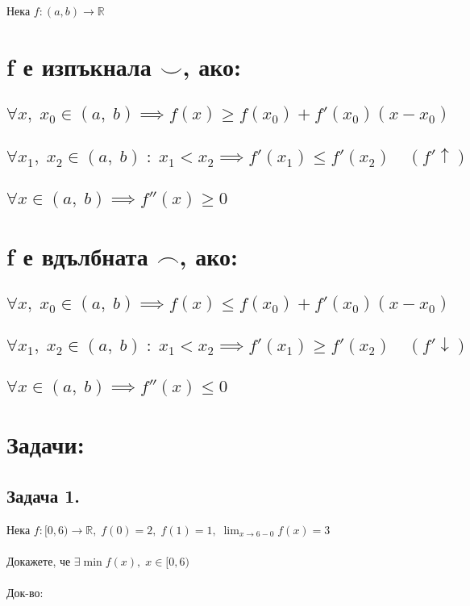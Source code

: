 \documentclass[12pt]{article}
\newcommand{\R}{\mathbb{R}}
\begin{document}
Нека \(f: (a, b) \to \R\)
\section*{f е изпъкнала \(\smile\), ако:}
\subsection*{\(\forall x, \; x_0 \in (a, \; b) \implies f(x) \geq f(x_0) + f'(x_0)(x - x_0)\)}
\subsection*{\(\forall x_1, \; x_2 \in (a, \; b) \; : \; x_1 < x_2 \implies f'(x_1) \leq f'(x_2) \quad (f'\uparrow) \)}
\subsection*{\(\forall x \in (a,\;  b) \implies f''(x) \geq 0\)}
\section*{f е вдълбната \(\frown\), ако:}
\subsection*{\(\forall x, \; x_0 \in (a, \; b) \implies f(x) \leq f(x_0) + f'(x_0)(x - x_0)\)}
\subsection*{\(\forall x_1, \; x_2 \in (a, \; b) \; : \; x_1 < x_2 \implies f'(x_1) \geq f'(x_2) \quad (f'\downarrow) \)}
\subsection*{\(\forall x \in (a, \; b) \implies f''(x) \leq 0\)}

\section*{Задачи:}

\subsection*{Задача 1.}

Нека \(f: [0, 6) \to \R, \; f(0) = 2, \; f(1) = 1, \; \displaystyle\lim_{x \to 6 - 0} f(x) = 3\) \\\\
Докажете, че \(\exists \min f(x), \; x \in [0, 6)\) \\\\
Док-во: \\
\end{document}
